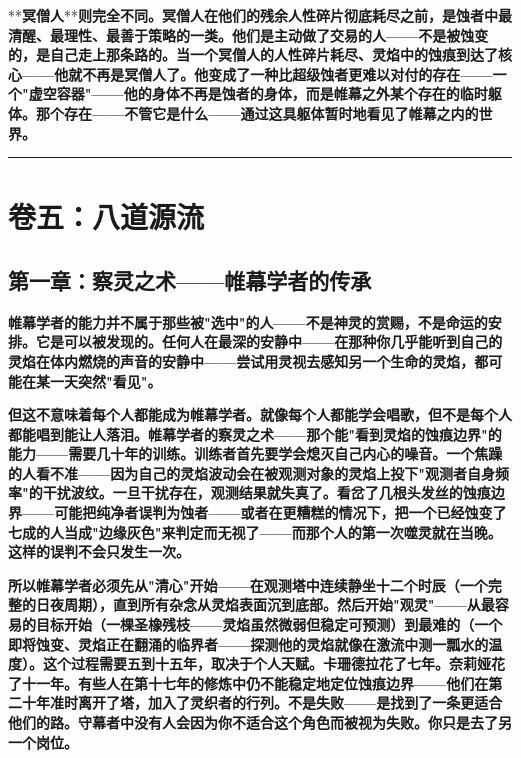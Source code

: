 \documentclass[12pt,a4paper,openany]{ctexbook}
\begin{document}
**\textbf{冥僧人}**\textbf{则完全不同。冥僧人在他们的残余人性碎片彻底耗尽之前，是蚀者中最清醒、最理性、最善于策略的一类。他们是主动做了交易的人——不是被蚀变的，是自己走上那条路的。当一个冥僧人的人性碎片耗尽、灵焰中的蚀痕到达了核心——他就不再是冥僧人了。他变成了一种比超级蚀者更难以对付的存在——一个"虚空容器"——他的身体不再是蚀者的身体，而是帷幕之外某个存在的临时躯体。那个存在——不管它是什么——通过这具躯体暂时地看见了帷幕之内的世界。}


\bigskip\hrule\bigskip


\chapter{卷五：八道源流}


\section*{第一章：察灵之术——帷幕学者的传承}


\textbf{帷幕学者的能力并不属于那些被"选中"的人——不是神灵的赏赐，不是命运的安排。它是可以被发现的。任何人在最深的安静中——在那种你几乎能听到自己的灵焰在体内燃烧的声音的安静中——尝试用灵视去感知另一个生命的灵焰，都可能在某一天突然"看见"。}


\textbf{但这不意味着每个人都能成为帷幕学者。就像每个人都能学会唱歌，但不是每个人都能唱到能让人落泪。帷幕学者的察灵之术——那个能"看到灵焰的蚀痕边界"的能力——需要几十年的训练。训练者首先要学会熄灭自己内心的噪音。一个焦躁的人看不准——因为自己的灵焰波动会在被观测对象的灵焰上投下"观测者自身频率"的干扰波纹。一旦干扰存在，观测结果就失真了。看岔了几根头发丝的蚀痕边界——可能把纯净者误判为蚀者——或者在更糟糕的情况下，把一个已经蚀变了七成的人当成"边缘灰色"来判定而无视了——而那个人的第一次噬灵就在当晚。这样的误判不会只发生一次。}


\textbf{所以帷幕学者必须先从"清心"开始——在观测塔中连续静坐十二个时辰（一个完整的日夜周期），直到所有杂念从灵焰表面沉到底部。然后开始"观灵"——从最容易的目标开始（一棵圣橡残枝——灵焰虽然微弱但稳定可预测）到最难的（一个即将蚀变、灵焰正在翻涌的临界者——探测他的灵焰就像在激流中测一瓢水的温度）。这个过程需要五到十五年，取决于个人天赋。卡珊德拉花了七年。奈莉娅花了十一年。有些人在第十七年的修炼中仍不能稳定地定位蚀痕边界——他们在第二十年准时离开了塔，加入了灵织者的行列。不是失败——是找到了一条更适合他们的路。守幕者中没有人会因为你不适合这个角色而被视为失败。你只是去了另一个岗位。}
\end{document}
